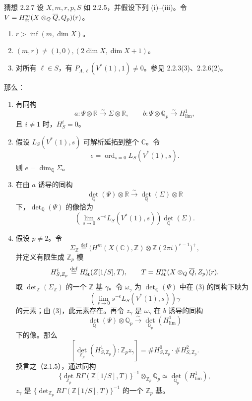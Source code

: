 \begin{statement}{猜想 2.2.7}
设 $X,m,r,p,S$ 如 2.2.5，并假设下列 (i)--(iii)。令
$V=H^m_{\mathrm{\acute et}}(X\otimes_{Q}\overline{Q},Q_p)(r)$。
\begin{enumerate}[label=(\roman*)]
\item $r>\inf(m,\dim X)$。
\item $(m,r)\ne(1,0),(2\dim X,\dim X+1)$。
\item 对所有 $\ell\in S$，有 $P_{\Lambda,\ell}(V^*(1),1)\ne0$。参见 2.2.3(3)、2.2.6(2)。
\end{enumerate}
那么：
\begin{enumerate}[label=(\arabic*)]
\item 有同构
\[
 a:\Psi\otimes\mathbb R\xrightarrow{\sim}\Sigma\otimes\mathbb R,
 \qquad b:\Psi\otimes\mathbb Q_p\xrightarrow{\sim}H^1_{\mathrm{lim}},
\]
且 $i\ne1$ 时，$H^i_S=0$。
\item 假设 $L_S(V^*(1),s)$ 可解析延拓到整个 $\mathbb C$。令
\[
 e=\operatorname{ord}_{s=0}L_S(V^*(1),s).
\]
则 $e=\dim_{\mathbb Q}\Sigma$。
\item 在由 $a$ 诱导的同构
\[
 \det_{\mathbb Q}(\Psi)\otimes\mathbb R
 \xrightarrow{\sim}\det_{\mathbb Q}(\Sigma)\otimes\mathbb R
\]
下，$\det_{\mathbb Q}(\Psi)$ 的像恰为
\[
 \left(\lim_{s\to0}s^{-e}L_S(V^*(1),s)\right)\det_{\mathbb Q}(\Sigma).
\]
\item 假设 $p\ne2$。令
\[
 \Sigma_{\mathbb Z}\overset{\mathrm{def}}=
 \bigl(H^m(X(\mathbb C),\mathbb Z)\otimes\mathbb Z(2\pi i)^{r-1}\bigr)^+,
\]
并定义有限生成 $\mathbb Z_p$ 模
\[
 H^i_{S,Z_p}\overset{\mathrm{def}}=
 H^i_{\mathrm{\acute et}}(Z[1/S],T),\qquad
 T=H^m_{\mathrm{\acute et}}(X\otimes_{Q}\overline{Q},Z_p)(r).
\]
取 $\det_{\mathbb Z}(\Sigma_{\mathbb Z})$ 的一个 $\mathbb Z$ 基 $\gamma$。令 $\omega_\gamma$ 为 $\det_{\mathbb Q}(\Psi)$ 中在 (3) 的同构下映为
\[
 \left(\lim_{s\to0}s^{-e}L_S(V^*(1),s)\right)\gamma
\]
的元素；由 (3)，此元素存在。再令 $z_\gamma$ 是 $\omega_\gamma$ 在 $b$ 诱导的同构
\[
 \det_{\mathbb Q}(\Psi)\otimes\mathbb Q_p
 \xrightarrow{\sim}\det_{\mathbb Q_p}(H^1_{\mathrm{lim}})
\]
下的像。那么
\[
 [\det_{\mathbb Z_p}(H^1_{S,\mathbb Z_p}):\mathbb Z_p z_\gamma]
 =\#H^0_{S,\mathbb Z_p}\cdot\#H^2_{S,\mathbb Z_p}.
\]
换言之（2.1.5），通过同构
\[
 \{\det_{\mathbb Z_p}R\Gamma(\mathbb Z[1/S],T)\}^{-1}
 \otimes_{\mathbb Z_p}\mathbb Q_p
 \simeq\det_{\mathbb Q_p}(H^1_{\mathrm{lim}}),
\]
$z_\gamma$ 是 $\{\det_{\mathbb Z_p}R\Gamma(\mathbb Z[1/S],T)\}^{-1}$ 的一个 $\mathbb Z_p$ 基。
\end{enumerate}
\end{statement}

